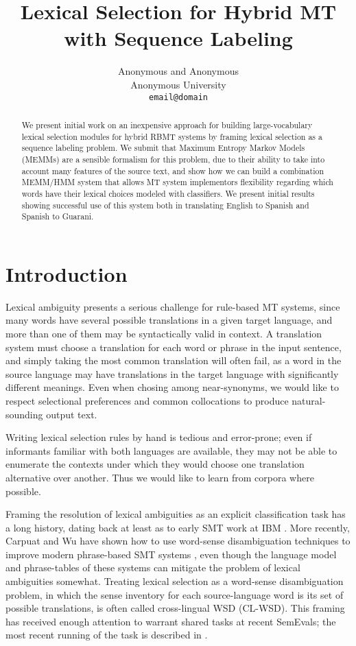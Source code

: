 \documentclass[11pt]{article}
\title{Lexical Selection for Hybrid MT with Sequence Labeling}
\author{Anonymous and Anonymous \\
  Anonymous University \\
  {\tt email@domain} \\
}
\date{}
\begin{document}
\maketitle
\begin{abstract}
We present initial work on an inexpensive approach for building
large-vocabulary lexical selection modules for hybrid RBMT systems by framing
lexical selection as a sequence labeling problem. We submit that Maximum
Entropy Markov Models (MEMMs) are a sensible formalism for this problem, due to
their ability to take into account many features of the source text, and show
how we can build a combination MEMM/HMM system that allows MT system
implementors flexibility regarding which words have their lexical choices
modeled with classifiers. We present initial results showing successful use of
this system both in translating English to Spanish and Spanish to Guarani.
\end{abstract}

\section{Introduction}
Lexical ambiguity presents a serious challenge for rule-based MT systems, since
many words have several possible translations in a given target language, and
more than one of them may be syntactically valid in context. A translation
system must choose a translation for each word or phrase in the input sentence,
and simply taking the most common translation will often fail, as a word in the
source language may have translations in the target language with significantly
different meanings. Even when chosing among near-synonyms, we would like to
respect selectional preferences and common collocations to produce
natural-sounding output text.

Writing lexical selection rules by hand is tedious and error-prone; even if
informants familiar with both languages are available, they may not be able to
enumerate the contexts under which they would choose one translation
alternative over another. Thus we would like to learn from corpora where
possible. 

Framing the resolution of lexical ambiguities as an explicit classification
task has a long history, dating back at least as to early SMT work at IBM
\cite{Brown91word-sensedisambiguation}.  More recently, Carpuat and Wu have
shown how to use word-sense disambiguation techniques to improve modern
phrase-based SMT systems \cite{carpuatpsd}, even though the language model and
phrase-tables of these systems can mitigate the problem of lexical ambiguities
somewhat. Treating lexical selection as a word-sense disambiguation problem, in
which the sense inventory for each source-language word is its set of possible
translations, is often called cross-lingual WSD (CL-WSD). This framing has
received enough attention to warrant shared tasks at recent SemEvals; the most
recent running of the task is described in \cite{task10}.
\end{document}
